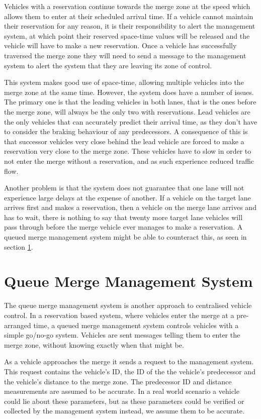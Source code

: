 Vehicles with a reservation continue towards the merge zone at the speed which allows them to enter at their scheduled arrival time. If a vehicle cannot maintain their reservation for any reason, it is their responsibility to alert the management system, at which point their reserved space-time values will be released and the vehicle will have to make a new reservation. Once a vehicle has successfully traversed the merge zone they will need to send a message to the management system to alert the system that they are leaving its zone of control. 

This system makes good use of space-time, allowing multiple vehicles into the merge zone at the same time. However, the system does have a number of issues. The primary one is that the leading vehicles in both lanes, that is the ones before the merge zone, will always be the only two with reservations. Lead vehicles are the only vehicles that can accurately predict their arrival time, as they don't have to consider the braking behaviour of any predecessors. A consequence of this is that successor vehicles very close behind the lead vehicle are forced to make a reservation very close to the merge zone. These vehicles have to slow in order to not enter the merge without a reservation, and as such experience reduced traffic flow.

Another problem is that the system does not guarantee that one lane will not experience large delays at the expense of another. If a vehicle on the target lane arrives first and makes a reservation, then a vehicle on the merge lane arrives and has to wait, there is nothing to say that twenty more target lane vehicles will pass through before the merge vehicle ever manages to make a reservation. A queued merge management system might be able to counteract this, as seen in section \ref{sec:Queue Merge Management System}.

\section{Queue Merge Management System}
\label{sec:Queue Merge Management System}
The queue merge management system is another approach to centralised vehicle control. In a reservation based system, where vehicles enter the merge at a pre-arranged time, a queued merge management system controls vehicles with a simple go/no-go system. Vehicles are sent messages telling them to enter the merge zone, without knowing exactly when that might be.

As a vehicle approaches the merge it sends a request to the management system. This request contains the vehicle's ID, the ID of the the vehicle's predecessor and the vehicle's distance to the merge zone. The predecessor ID and distance measurements are assumed to be accurate. In a real world scenario a vehicle could lie about these parameters, but as these parameters could be verified or collected by the management system instead, we assume them to be accurate.

